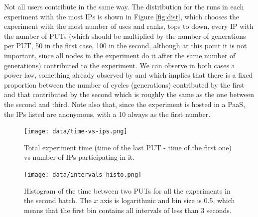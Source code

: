 \documentclass{sig-alternate}
\begin{document}
Not all users contribute in the same way. The distribution for the
runs in each experiment with the most IPs is shown in Figure
\ref{fig:dist}, which chooses the experiment with the most number of
uses and ranks, tops to down, every IP with the number of PUTs (which
should be multiplied by the number of generations per PUT, 50 in the
first case, 100 in the second, although at this point it is not
important, since all nodes in the experiment do it after the same
number of generations) contributed to the experiment. We can observe
in both cases a power law, something already observed by \cite{agajaj}
and which implies that there is a fixed proportion between the number
of cycles (generations) contributed by the first and that contributed
by the second which is roughly the same as the one between the second
and third. Note also that, since the experiment is hosted in a PaaS,
the IPs listed are anonymous, with a 10 always as the first number.
%
\begin{figure}[htb]
        \centering
        \texttt{[image: data/time-vs-ips.png]}
        \caption{Total experiment time (time of the last PUT - time of
        the first one) vs number of IPs participating in it.}\label{fig:t}
\end{figure}
%
\begin{figure}[htb]
        \centering
        \texttt{[image: data/intervals-histo.png]}
        \caption{Histogram of the time between two PUTs for all the
          experiments in the second batch. The $x$ axis is logarithmic
        and bin size is 0.5, which means that the first bin contains
        all intervals of less than 3 seconds.}\label{fig:intervals}
\end{figure}
\end{document}
